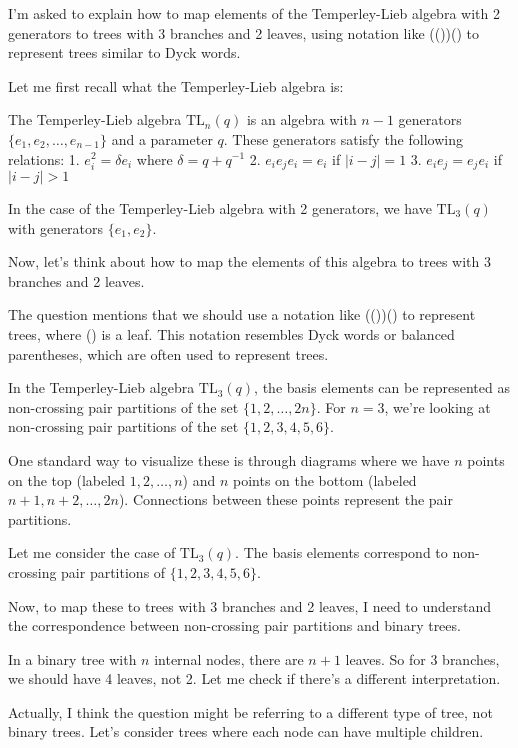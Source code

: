 \documentclass[12p]{article}
\newcounter{reasoningcounter}
\newenvironment{reasoning}[1][]
{\refstepcounter{reasoningcounter}%
\begin{tcolorbox}[
    title=Reasoning \thereasoningcounter: #1,
    colback=white, %
    colframe=gray,
    coltext=black, %
    fonttitle=\bfseries\normalsize,
    top=2mm,
    bottom=2mm,
    enlarge top initially by=5mm
]
\small
}
{\end{tcolorbox}}
\begin{document}
\begin{reasoning}
I'm asked to explain how to map elements of the Temperley-Lieb algebra with 2 generators to trees with 3 branches and 2 leaves, using notation like (())() to represent trees similar to Dyck words.

Let me first recall what the Temperley-Lieb algebra is:

The Temperley-Lieb algebra $\text{TL}_n(q)$ is an algebra with $n-1$ generators $\{e_1, e_2, \ldots, e_{n-1}\}$ and a parameter $q$. These generators satisfy the following relations:
1. $e_i^2 = \delta e_i$ where $\delta = q + q^{-1}$
2. $e_i e_j e_i = e_i$ if $|i-j| = 1$
3. $e_i e_j = e_j e_i$ if $|i-j| > 1$

In the case of the Temperley-Lieb algebra with 2 generators, we have $\text{TL}_3(q)$ with generators $\{e_1, e_2\}$.

Now, let's think about how to map the elements of this algebra to trees with 3 branches and 2 leaves.

The question mentions that we should use a notation like (())() to represent trees, where () is a leaf. This notation resembles Dyck words or balanced parentheses, which are often used to represent trees.

In the Temperley-Lieb algebra $\text{TL}_3(q)$, the basis elements can be represented as non-crossing pair partitions of the set $\{1, 2, \ldots, 2n\}$. For $n=3$, we're looking at non-crossing pair partitions of the set $\{1, 2, 3, 4, 5, 6\}$.

One standard way to visualize these is through diagrams where we have $n$ points on the top (labeled $1, 2, \ldots, n$) and $n$ points on the bottom (labeled $n+1, n+2, \ldots, 2n$). Connections between these points represent the pair partitions.

Let me consider the case of $\text{TL}_3(q)$. The basis elements correspond to non-crossing pair partitions of $\{1, 2, 3, 4, 5, 6\}$.

Now, to map these to trees with 3 branches and 2 leaves, I need to understand the correspondence between non-crossing pair partitions and binary trees.

In a binary tree with $n$ internal nodes, there are $n+1$ leaves. So for 3 branches, we should have 4 leaves, not 2. Let me check if there's a different interpretation.

Actually, I think the question might be referring to a different type of tree, not binary trees. Let's consider trees where each node can have multiple children.


\end{reasoning}
\end{document}
